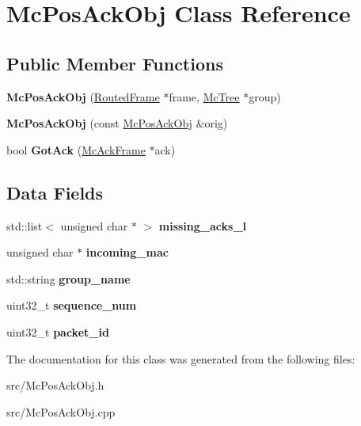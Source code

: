 \hypertarget{classMcPosAckObj}{\section{Mc\-Pos\-Ack\-Obj Class Reference}
\label{classMcPosAckObj}
}
\subsection*{Public Member Functions}
\begin{DoxyCompactItemize}
\item 
\hypertarget{classMcPosAckObj_aa63ad2946065ff26a78671109af67ca8}{{\bfseries Mc\-Pos\-Ack\-Obj} (\hyperlink{classRoutedFrame}{Routed\-Frame} $\ast$frame, \hyperlink{classMcTree}{Mc\-Tree} $\ast$group)}\label{classMcPosAckObj_aa63ad2946065ff26a78671109af67ca8}

\item 
\hypertarget{classMcPosAckObj_a9c1f1e33883f308f0ccad7ddf2b044a1}{{\bfseries Mc\-Pos\-Ack\-Obj} (const \hyperlink{classMcPosAckObj}{Mc\-Pos\-Ack\-Obj} \&orig)}\label{classMcPosAckObj_a9c1f1e33883f308f0ccad7ddf2b044a1}

\item 
\hypertarget{classMcPosAckObj_a747dfe74d820a1dbc08732c82d79c85e}{bool {\bfseries Got\-Ack} (\hyperlink{classMcAckFrame}{Mc\-Ack\-Frame} $\ast$ack)}\label{classMcPosAckObj_a747dfe74d820a1dbc08732c82d79c85e}

\end{DoxyCompactItemize}
\subsection*{Data Fields}
\begin{DoxyCompactItemize}
\item 
\hypertarget{classMcPosAckObj_ad909900f199558f70262cb253bb9294d}{std\-::list$<$ unsigned char $\ast$ $>$ {\bfseries missing\-\_\-acks\-\_\-l}}\label{classMcPosAckObj_ad909900f199558f70262cb253bb9294d}

\item 
\hypertarget{classMcPosAckObj_a8d7afb2c0a16577e604a7e39d55fcb9a}{unsigned char $\ast$ {\bfseries incoming\-\_\-mac}}\label{classMcPosAckObj_a8d7afb2c0a16577e604a7e39d55fcb9a}

\item 
\hypertarget{classMcPosAckObj_acc1cf85260df78347cc24613bca1070e}{std\-::string {\bfseries group\-\_\-name}}\label{classMcPosAckObj_acc1cf85260df78347cc24613bca1070e}

\item 
\hypertarget{classMcPosAckObj_a45476d77f496bf607b7a3e0fe077fa9c}{uint32\-\_\-t {\bfseries sequence\-\_\-num}}\label{classMcPosAckObj_a45476d77f496bf607b7a3e0fe077fa9c}

\item 
\hypertarget{classMcPosAckObj_aa49ed639148f2b70a6b0e5893f2f36b7}{uint32\-\_\-t {\bfseries packet\-\_\-id}}\label{classMcPosAckObj_aa49ed639148f2b70a6b0e5893f2f36b7}

\end{DoxyCompactItemize}


The documentation for this class was generated from the following files\-:\begin{DoxyCompactItemize}
\item 
src/Mc\-Pos\-Ack\-Obj.\-h\item 
src/Mc\-Pos\-Ack\-Obj.\-cpp\end{DoxyCompactItemize}
